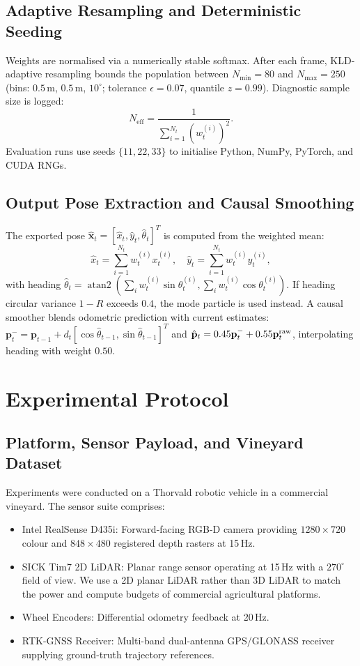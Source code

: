\documentclass[letterpaper, 10 pt, conference]{ieeeconf}
\begin{document}
\subsection{Adaptive Resampling and Deterministic Seeding}
Weights are normalised via a numerically stable softmax. After each frame, KLD-adaptive resampling bounds the population between $N_{\min}=80$ and $N_{\max}=250$ (bins: $0.5\,$m, $0.5\,$m, $10^\circ$; tolerance $\epsilon=0.07$, quantile $z=0.99$). Diagnostic sample size is logged:
\begin{equation}
N_{\text{eff}} = \frac{1}{\sum_{i=1}^{N_t} (w_t^{(i)})^2}.
\end{equation}
Evaluation runs use seeds $\{11,22,33\}$ to initialise Python, NumPy, PyTorch, and CUDA RNGs.

\subsection{Output Pose Extraction and Causal Smoothing}
The exported pose $\hat{\mathbf{x}}_t = [\hat{x}_t, \hat{y}_t, \hat{\theta}_t]^T$ is computed from the weighted mean:
\begin{equation}
\hat{x}_t = \sum_{i=1}^{N_t} w_t^{(i)} x_t^{(i)}, \quad \hat{y}_t = \sum_{i=1}^{N_t} w_t^{(i)} y_t^{(i)},
\end{equation}
with heading $\hat{\theta}_t = \operatorname{atan2}(\sum_i w_t^{(i)}\sin\theta_t^{(i)}, \sum_i w_t^{(i)}\cos\theta_t^{(i)})$. If heading circular variance $1-R$ exceeds $0.4$, the mode particle is used instead. A causal smoother blends odometric prediction with current estimates: $\mathbf{p}_t^- = \mathbf{p}_{t-1}+d_t[\cos\hat{\theta}_{t-1},\sin\hat{\theta}_{t-1}]^T$ and $\hat{\mathbf{p}}_t=0.45\mathbf{p}_t^-+0.55\mathbf{p}_t^{\rm raw}$, interpolating heading with weight $0.50$.

\section{Experimental Protocol}
\label{sec:protocol}

\subsection{Platform, Sensor Payload, and Vineyard Dataset}
Experiments were conducted on a Thorvald robotic vehicle in a commercial vineyard. The sensor suite comprises:
\begin{itemize}
  \item Intel RealSense D435i: Forward-facing RGB-D camera providing $1280\times720$ colour and $848\times480$ registered depth rasters at 15\,Hz.
  \item SICK Tim7 2D LiDAR: Planar range sensor operating at 15\,Hz with a $270^\circ$ field of view. We use a 2D planar LiDAR rather than 3D LiDAR to match the power and compute budgets of commercial agricultural platforms.
  \item Wheel Encoders: Differential odometry feedback at 20\,Hz.
  \item RTK-GNSS Receiver: Multi-band dual-antenna GPS/GLONASS receiver supplying ground-truth trajectory references.
\end{itemize}
\end{document}
